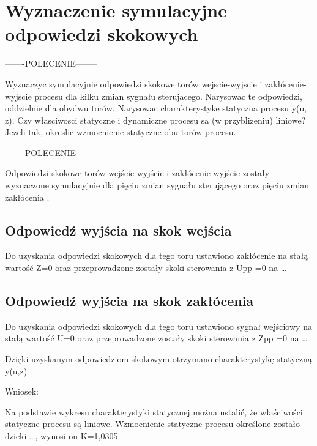 \section{Wyznaczenie symulacyjne odpowiedzi skokowych}

-------POLECENIE--------

Wyznaczyc symulacyjnie odpowiedzi skokowe torów wejscie-wyjscie i zakłócenie-wyjscie
procesu dla kilku zmian sygnału sterujacego. Narysowac te odpowiedzi, oddzielnie dla
obydwu torów. Narysowac charakterystyke statyczna procesu y(u, z). Czy własciwosci
statyczne i dynamiczne procesu sa (w przyblizeniu) liniowe? Jezeli tak, okreslic
wzmocnienie statyczne obu torów procesu.

-------POLECENIE--------


Odpowiedzi skokowe torów wejście-wyjście i zakłócenie-wyjście zostały wyznaczone
symulacyjnie dla pięciu zmian sygnału sterującego oraz pięciu zmian zakłócenia .

\subsection{Odpowiedź wyjścia na skok wejścia}

Do uzyskania odpowiedzi skokowych dla tego toru ustawiono zakłócenie na stałą
wartość Z=0 oraz przeprowadzone zostały skoki sterowania z Upp =0 na …

\subsection{Odpowiedź wyjścia na skok zakłócenia}

Do uzyskania odpowiedzi skokowych dla tego toru ustawiono sygnał wejściowy na stałą
wartość U=0 oraz przeprowadzone zostały skoki sterowania z Zpp =0 na …

Dzięki uzyskanym odpowiedziom skokowym otrzymano charakterystykę statyczną y(u,z)

Wniosek: 

Na podstawie wykresu charakterystyki statycznej można ustalić, że właściwości
statyczne procesu są liniowe. Wzmocnienie statyczne procesu określone zostało dzieki …,
wynosi on K=1,0305.
